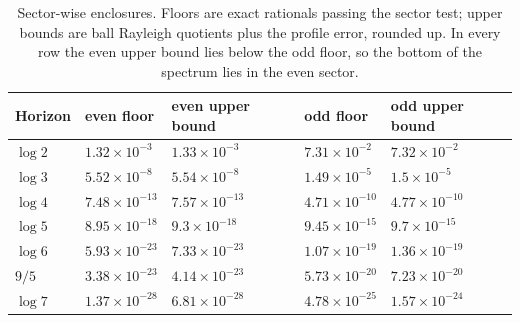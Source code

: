 \begin{table}[ht]
\centering
\caption{Sector-wise enclosures. Floors are exact rationals passing the sector test; upper bounds are ball Rayleigh quotients plus the profile error, rounded up. In every row the even upper bound lies below the odd floor, so the bottom of the spectrum lies in the even sector.}
\label{tab:sectors}
\begin{tabular}{@{}lllll@{}}
\toprule
Horizon & even floor & even upper bound & odd floor & odd upper bound\\
\midrule
$\log2$ & $1.32\times10^{-3}$ & $1.33\times10^{-3}$ & $7.31\times10^{-2}$ & $7.32\times10^{-2}$\\
$\log3$ & $5.52\times10^{-8}$ & $5.54\times10^{-8}$ & $1.49\times10^{-5}$ & $1.5\times10^{-5}$\\
$\log4$ & $7.48\times10^{-13}$ & $7.57\times10^{-13}$ & $4.71\times10^{-10}$ & $4.77\times10^{-10}$\\
$\log5$ & $8.95\times10^{-18}$ & $9.3\times10^{-18}$ & $9.45\times10^{-15}$ & $9.7\times10^{-15}$\\
$\log6$ & $5.93\times10^{-23}$ & $7.33\times10^{-23}$ & $1.07\times10^{-19}$ & $1.36\times10^{-19}$\\
$9/5$ & $3.38\times10^{-23}$ & $4.14\times10^{-23}$ & $5.73\times10^{-20}$ & $7.23\times10^{-20}$\\
$\log7$ & $1.37\times10^{-28}$ & $6.81\times10^{-28}$ & $4.78\times10^{-25}$ & $1.57\times10^{-24}$\\
\bottomrule
\end{tabular}
\end{table}
